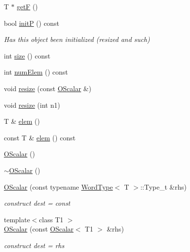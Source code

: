\begin{DoxyCompactItemize}
T $\ast$ \mbox{\hyperlink{classENSEM_1_1OScalar_a040999918115f255a411fd96ad87663f}{getF}} ()
\item 
bool \mbox{\hyperlink{classENSEM_1_1OScalar_a2de94d9cb377fa4ca961d0a8906a76b6}{initP}} () const
\begin{DoxyCompactList}\small\item\em Has this object been initialized (resized and such) \end{DoxyCompactList}\item 
int \mbox{\hyperlink{classENSEM_1_1OScalar_a2029adc2feeab03e85a091ab6878fc2d}{size}} () const
\item 
int \mbox{\hyperlink{classENSEM_1_1OScalar_aa9a7a2cddc34ba1add28369a764ced80}{num\+Elem}} () const
\item 
void \mbox{\hyperlink{classENSEM_1_1OScalar_ab7d5b96a7f1a3451bedd04eda3169c84}{resize}} (const \mbox{\hyperlink{classENSEM_1_1OScalar}{O\+Scalar}} \&)
\item 
void \mbox{\hyperlink{classENSEM_1_1OScalar_ab8b1ad6566b12cb3036794b47bb0ae8d}{resize}} (int n1)
\item 
T \& \mbox{\hyperlink{classENSEM_1_1OScalar_af07cc94eb09bfc29991d8fdc30727574}{elem}} ()
\item 
const T \& \mbox{\hyperlink{classENSEM_1_1OScalar_af797ae7d3763acab7b024aa159b3a7b8}{elem}} () const
\item 
\mbox{\hyperlink{classENSEM_1_1OScalar_abd51915d3c7af4b8ea33923eee128c2c}{O\+Scalar}} ()
\item 
\mbox{\hyperlink{classENSEM_1_1OScalar_ac08c93c225f24926096565485406c529}{$\sim$\+O\+Scalar}} ()
\item 
\mbox{\hyperlink{classENSEM_1_1OScalar_a62bd0b52eff623c7e4911aa896c97ccf}{O\+Scalar}} (const typename \mbox{\hyperlink{structENSEM_1_1WordType}{Word\+Type}}$<$ T $>$\+::Type\+\_\+t \&rhs)
\begin{DoxyCompactList}\small\item\em construct dest = const \end{DoxyCompactList}\item 
{\footnotesize template$<$class T1 $>$ }\\\mbox{\hyperlink{classENSEM_1_1OScalar_a12d201aefa6cbf8648247fdcc6f08669}{O\+Scalar}} (const \mbox{\hyperlink{classENSEM_1_1OScalar}{O\+Scalar}}$<$ T1 $>$ \&rhs)
\begin{DoxyCompactList}\small\item\em construct dest = rhs \end{DoxyCompactList}\item 

\end{DoxyCompactItemize}
